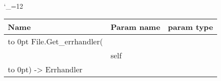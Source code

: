 \begingroup \catcode`\_=12 \tt
\begin{tabular}{lll}
\toprule
\textrm{Name}&\textrm{Param name}&\textrm{param type}\\
\midrule
\hbox to 0pt {File.Get_errhandler(\hss}\\
& self\\
\hbox to 0pt{) -> Errhandler\hss}\\
\bottomrule
\end{tabular}
\endgroup
